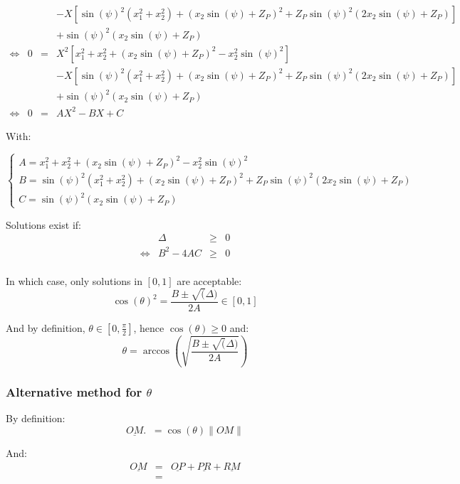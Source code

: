 \documentclass[a4paper,11pt,twoside,titlepage,openright]{book}
\numberwithin{equation}{section}
\newcommand{\lt}{\left}
\newcommand{\rt}{\right}
\DeclareMathOperator{\ez}{\underline{e}_z}
\begin{document}
$$\begin{array}{lllll}
    & & & - X\lt[ \sin(\psi)^2\lt(x_1^2+x_2^2\rt) + \lt(x_2\sin(\psi) + Z_P\rt)^2 + Z_P\sin(\psi)^2\lt(2x_2\sin(\psi) + Z_P\rt)\rt]\\
    & & & + \sin(\psi)^2\lt(x_2\sin(\psi) + Z_P\rt)\\
    \Leftrightarrow
    & 0 & = & X^2\lt[ x_1^2 + x_2^2 + \lt(x_2\sin(\psi) + Z_P\rt)^2 - x_2^2\sin(\psi)^2 \rt]\\
    & & & - X\lt[ \sin(\psi)^2\lt(x_1^2+x_2^2\rt) + \lt(x_2\sin(\psi) + Z_P\rt)^2 + Z_P\sin(\psi)^2\lt(2x_2\sin(\psi) + Z_P\rt)\rt]\\
    & & & + \sin(\psi)^2\lt(x_2\sin(\psi) + Z_P\rt)\\
    \Leftrightarrow
    & 0 & = & AX^2 - BX + C
\end{array}
$$

With:

$$
\lt\{
	\begin{array}{lll}
		A = x_1^2 + x_2^2 + \lt(x_2\sin(\psi) + Z_P\rt)^2 - x_2^2\sin(\psi)^2\\
		B = \sin(\psi)^2\lt(x_1^2+x_2^2\rt) + \lt(x_2\sin(\psi) + Z_P\rt)^2 + Z_P\sin(\psi)^2\lt(2x_2\sin(\psi) + Z_P\rt)\\
		C = \sin(\psi)^2\lt(x_2\sin(\psi) + Z_P\rt)
	\end{array}
\rt.
$$

Solutions exist if:
$$
\begin{array}{lllll}
    & \Delta & \geq & 0\\
    \Leftrightarrow
    & B^2 - 4AC & \geq & 0\\
\end{array}
$$

In which case, only solutions in $\lt[0,1\rt]$ are acceptable:
$$
\cos(\theta)^2 = \frac{B \pm \sqrt(\Delta)}{2A} \in \lt[0,1\rt]
$$

And by definition, $\theta \in \lt[0,\frac{\pi}{2}\rt]$, hence $\cos(\theta)\geq0$ and:
$$
\theta = \arccos\lt(\sqrt{\frac{B \pm \sqrt(\Delta)}{2A}}\rt)
$$

\subsubsection{Alternative method for $\theta$}

By definition:
$$
\underline{OM}.\ez = \cos(\theta)\|OM\|
$$

And:
$$
\begin{array}{lllll}
	\underline{OM} 	& = & \underline{OP} + \underline{PR} + \underline{RM}\\
			& = & \\
\end{array}
$$
\end{document}
